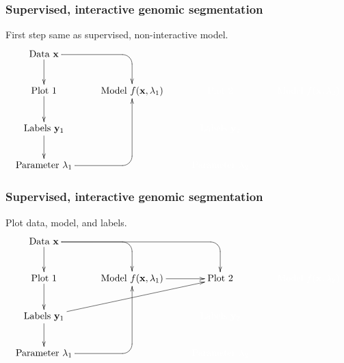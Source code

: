 \documentclass{beamer}
\begin{document}
\begin{frame}
  \frametitle{Supervised, interactive genomic segmentation}
  First step same as supervised, non-interactive model.
  \small
  \begin{displaymath}
  \xymatrix{
    \text{Data $\mathbf x$}
    \ar `[r] [dr] 
    \ar [d]
    & \text{ }
    & \text{ }
    & \text{ }
    \\
    \text{Plot 1} 
    \ar [d]
    & 
    \text{Model $f(\mathbf x, \lambda_1)$} 
    &
    \color{white}{\text{Plot 2} }
    & 
    \color{white}{\text{Model $f(\mathbf x, \lambda_2)$} }
    \\
    \text{Labels $\mathbf y_1$}       
    \ar [d]
    &
    &
    \color{white}{\text{Labels $\mathbf y_2$}}
    \\
    \text{Parameter $\lambda_1$} 
    \ar `r[ruu] [ruu]
    & \text{ }
    & 
    \color{white}{\text{Parameter $\lambda_2$}}
  }
  \end{displaymath}
\end{frame}

\begin{frame}
  \frametitle{Supervised, interactive genomic segmentation}
  Plot data, model, and labels.
  \small
  \begin{displaymath}
  \xymatrix{
    \text{Data $\mathbf x$}
    \ar `[r] [dr] 
    \ar `r[rr] [drr] 
    \ar [d]
    & \text{ }
    & \text{ }
    & \text{ }
    \\
    \text{Plot 1} 
    \ar [d]
    & 
    \text{Model $f(\mathbf x, \lambda_1)$} 
    \ar [r]
    &
    \text{Plot 2} 
    & 
    \color{white}{\text{Model $f(\mathbf x, \lambda_2)$} }
    \\
    \text{Labels $\mathbf y_1$}       
    \ar [d]
    \ar [rru]
    &
    &
    \color{white}{\text{Labels $\mathbf y_2$}}
    \\
    \text{Parameter $\lambda_1$} 
    \ar `r[ruu] [ruu]
    & \text{ }
    & 
    \color{white}{\text{Parameter $\lambda_2$}}
  }
  \end{displaymath}
\end{frame}
\end{document}
